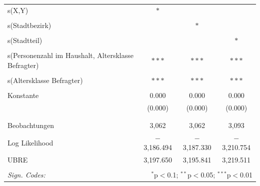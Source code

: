 \documentclass{Vorlage}
\begin{document}
\begin{appendix}
\begin{table}[h]
\begin{tabular}{@{\extracolsep{5pt}}lccc}
 s(X,Y) & $*$ &  &  \\ 
  & & & \\ 
 s(Stadtbezirk) &  & $*$ &  \\ 
  & & & \\ 
 s(Stadtteil)&  &  & $*$ \\ 
  & & & \\ 
 s(Personenzahl im Haushalt, Altersklasse Befragter) & $***$ & $***$ & $***$  \\ 
  & & & \\ 
 s(Altersklasse Befragter) & $***$ & $***$  & $***$ \\ 
  & & & \\ 
 Konstante & 0.000 & 0.000 & 0.000 \\ 
  & (0.000) & (0.000) & (0.000) \\ 
  & & & \\ 
\hline \\[-1.8ex] 
Beobachtungen & 3,062 & 3,062 & 3,093 \\ 
Log Likelihood & $-$3,186.494 & $-$3,187.330 & $-$3,210.754 \\ 
UBRE & 3,197.650 & 3,195.841 & 3,219.511 \\ 
\hline 
\hline \\[-1.8ex] 
\textit{Sign. Codes:}  & \multicolumn{3}{r}{$^{*}$p$<$0.1; $^{**}$p$<$0.05; $^{***}$p$<$0.01} \\ 
\end{tabular} 
\end{table} 


\end{appendix}
\end{document}
